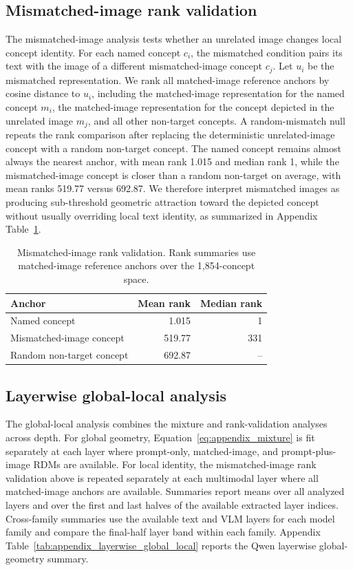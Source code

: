 \documentclass{article}
\begin{document}
\subsection{Mismatched-image rank validation}

The mismatched-image analysis tests whether an unrelated image changes local concept identity. For each named concept \(c_i\), the mismatched condition pairs its text with the image of a different mismatched-image concept \(c_j\). Let \(u_i\) be the mismatched representation. We rank all matched-image reference anchors by cosine distance to \(u_i\), including the matched-image representation for the named concept \(m_i\), the matched-image representation for the concept depicted in the unrelated image \(m_j\), and all other non-target concepts. A random-mismatch null repeats the rank comparison after replacing the deterministic unrelated-image concept with a random non-target concept. The named concept remains almost always the nearest anchor, with mean rank 1.015 and median rank 1, while the mismatched-image concept is closer than a random non-target on average, with mean ranks 519.77 versus 692.87. We therefore interpret mismatched images as producing sub-threshold geometric attraction toward the depicted concept without usually overriding local text identity, as summarized in Appendix Table~\ref{tab:appendix_identity_separability}.

\begin{table}[!htbp]
\centering
\caption{Mismatched-image rank validation. Rank summaries use matched-image reference anchors over the 1,854-concept space.}
\label{tab:appendix_identity_separability}
\footnotesize
\begin{tabular}{lrr}
\toprule
Anchor & Mean rank & Median rank \\
\midrule
Named concept & 1.015 & 1 \\
Mismatched-image concept & 519.77 & 331 \\
Random non-target concept & 692.87 & -- \\
\bottomrule
\end{tabular}
\end{table}

\subsection{Layerwise global-local analysis}

The global-local analysis combines the mixture and rank-validation analyses across depth. For global geometry, Equation~\ref{eq:appendix_mixture} is fit separately at each layer where prompt-only, matched-image, and prompt-plus-image RDMs are available. For local identity, the mismatched-image rank validation above is repeated separately at each multimodal layer where all matched-image anchors are available. Summaries report means over all analyzed layers and over the first and last halves of the available extracted layer indices. Cross-family summaries use the available text and VLM layers for each model family and compare the final-half layer band within each family. Appendix Table~\ref{tab:appendix_layerwise_global_local} reports the Qwen layerwise global-geometry summary.
\end{document}
